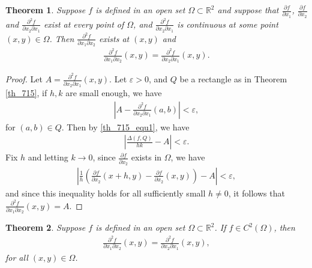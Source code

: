 \documentclass[11pt]{book}
\newtheorem{theorem}{Theorem}[chapter]
\theoremstyle{definition}
\numberwithin{equation}{chapter}
\begin{document}
\medskip

\begin{theorem}
Suppose $f$ is defined in an open set $\Omega \subset \mathbb{R}^2$ and suppose that $\frac{\partial f}{\partial x_1}$, $\frac{\partial f}{\partial x_2}$ and $\frac{\partial^2 f}{\partial x_2 \partial x_1}$  exist at every point of $\Omega$, and $\frac{\partial^2 f}{\partial x_2 \partial x_1}$ is continuous at some point $(x,y) \in \Omega$. Then $\frac{\partial^2 f}{\partial x_1 \partial x_2}$ exists at $(x,y)$ and 
\begin{align*}
    \frac{\partial^2 f}{\partial x_1 \partial x_2}(x,y) = \frac{\partial^2 f}{\partial x_2 \partial x_1}(x,y).
\end{align*}
\end{theorem}
\begin{proof}
Let $A = \frac{\partial^2 f}{\partial x_2 \partial x_1}(x,y)$. Let $\varepsilon > 0$, and $Q$ be a rectangle as in Theorem \ref{th_715}, if $h,k$ are small enough, we have
\begin{align*}
    \left|A - \frac{\partial^2 f}{\partial x_2 \partial x_1}(a,b)\right| < \varepsilon,
\end{align*}
for $(a,b) \in Q$. Then by \eqref{th_715_equ1}, we have
\begin{align*}
    \left|\frac{\Delta (f,Q)}{hk} - A\right| < \varepsilon.
\end{align*}
Fix $h$ and letting $k \to 0$, since $\frac{\partial f}{\partial x_2}$ exists in $\Omega$, we have
\begin{align*}
    \left|\frac{1}{h}\left(\frac{\partial f}{\partial x_2}(x+h,y) - \frac{\partial f}{\partial x_2}(x,y)\right) - A\right| < \varepsilon,
\end{align*}
and since this inequality holds for all sufficiently small $h \neq 0$, it follows that $\frac{\partial^2 f}{\partial x_1 \partial x_2}(x,y) = A$.
\end{proof}

\medskip

\begin{theorem}\label{th_717}
Suppose $f$ is defined in an open set $\Omega \subset \mathbb{R}^2$. If $f \in C^2(\Omega)$, then
\begin{align*}
    \frac{\partial^2 f}{\partial x_1 \partial x_2}(x,y) = \frac{\partial^2 f}{\partial x_2 \partial x_1}(x,y),
\end{align*}
for all $(x,y) \in \Omega$.
\end{theorem}

\medskip
\end{document}
